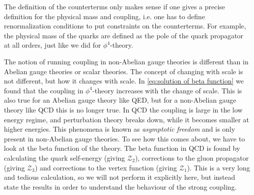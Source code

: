 The definition of the counterterms only makes sense if one gives a precise definition for the physical mass and coupling, i.e. one has to define renormalization conditions to put constraints on the counterterms. For example, the physical mass of the quarks are defined as the pole of the quark propagator at all orders, just like we did for $\phi^{4}$-theory. 

The notion of running coupling in non-Abelian gauge theories is different than in Abelian gauge theories or scalar theories. The concept of changing with scale is not different, but how it changes with scale. In \cref{eq:solution of beta function} we found that the coupling in $\phi^{4}$-theory increases with the change of scale. This is also true for an Abelian gauge theory like QED, but for a non-Abelian gauge theory like QCD this is no longer true. In QCD the coupling is large in the low energy regime, and perturbation theory breaks down, while it becomes smaller at higher energies. This phenomena is known as \emph{asymptotic freedom} and is only present in non-Abelian gauge theories. To see how this comes about, we have to look at the beta function of the theory. The beta function in QCD is found by calculating the quark self-energy (giving $\mathcal{Z}_2$), corrections to the gluon propagator (giving $\mathcal{Z}_3$) and corrections to the vertex function (giving $\mathcal{Z}_1$). This is a very long and tedious calculation, so we will not perform it explicitly here, but instead state the results in order to understand the behaviour of the strong coupling.

